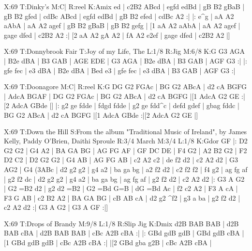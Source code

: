 \documentclass{article}
\begin{document}
\begin{abc}[name]
X:69
T:Dinky's
M:C|
R:reel
K:Amix
ed | c2B2 ABcd | egfd edBd | gB B2 gBaB | gB B2 gfed |
cdBc ABcd | egfd edBd | gB B2 efed | cdBc A2 :|
|: e^g | aA A2 aAbA | aA A2 agef | gB B2 gBaB | gB B2 gefg |
[1 aA A2 aAbA | aA A2 agef | gage dfed | c2B2 A2 :|
[2 aA A2 gA A2 | fA A2 e2ef | gage dfed | c2B2 A2 |]
\end{abc}

\begin{abc}[name]
X:69
T:Donnybrook Fair
T:Joy of my Life, The
L:1/8
R:Jig
M:6/8
K:G
G3 AGA | B2e dBA | B3 GAB | AGE EDE |
G3 AGA | B2e dBA | B3 GAB | AGF G3 :|
|: gfe fec | e3 dBA | B2e dBA | Bed e3 |
gfe fec | e3 dBA | B3 GAB | AGF G3 :|
\end{abc}

\begin{abc}[name]
X:69
T:Doonagore
M:C|
R:reel
K:G
DG G2 FGAc | BG G2 ABcA | d2 cA BGFG | AdcA BGAF |
DG G2 FGAc | BG G2 ABcA | d2 cA BGFG |[1 AdcA G2 GE :|[2 AdcA GBde |]
|: g2 ge fdde | fdgd fdde | g2 ge fdd^c | defd gdef |
gbag fddc | BG G2 ABcA | d2 cA BGFG |[1 AdcA GBde :|[2 AdcA G2 GE |]
\end{abc}

\begin{abc}[name]
X:69
T:Down the Hill
S:From the album "Traditional Music of Ireland", by James Kelly, Paddy O'Brien, Daithi Sproule
R:3/4 March
M:3/4
L:1/8
K:Gdor
GF |: D2 G2 G2 | G4 A2 | BA GA BG | AG FG AF |
GF DC DE | F4 G2 | A2 B2 G2 | F2 D2 C2 |
D2 G2 G2 | G4 AB | AG FG AB | c2 A2 c2 |
de f2 d2 | c2 A2 d2 | G3 AG2 | G4 (3ABc |
d2 g2 g2 | g4 a2 | ba ga bg | a2 f2 d2 |
c2 f2 f2 | f4 g2 | ag fg af | g2 f2 dc |
d2 g2 g2 | g4 a2 | ba ga bg | ag fg af |
g2 f2 d2 | c2 A2 d2 |: G3 A G2 | G2 =B2 d2 |
g2 d2 =B2 | G2 =Bd G=B | dG =Bd Ac | f2 c2 A2 |
F3 A cA | F3 G AB | c2 B2 A2 | BA GA BG |
cB AB cA | d2 g2 ^f2 | g3 a ba | g2 f2 d2 |
c2 A2 d2 :| G3 A G2 | G3 A GF :|]
\end{abc}

\begin{abc}[name]
X:69
T:Drops of Brandy
M:9/8
L:1/8
R:Slip Jig
K:Dmix
d2B BAB BAB | d2B BAB cBA | d2B BAB BAB | cBc A2B cBA :|
|: GBd gdB gdB | GBd gdB cBA |[1 GBd gdB gdB | cBc A2B cBA :|
|[2 GBd gba g2B | cBc A2B cBA |
\end{abc}
\end{document}
